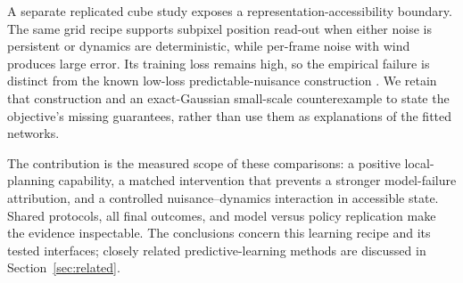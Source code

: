 A separate replicated cube study exposes a representation-accessibility boundary. The same grid
recipe supports subpixel position read-out when either noise is persistent or dynamics are
deterministic, while per-frame noise with wind produces large error. Its training loss remains high,
so the empirical failure is distinct from the known low-loss predictable-nuisance construction
\citep{sobal2022slow}. We retain that construction and an exact-Gaussian small-scale counterexample
to state the objective's missing guarantees, rather than use them as explanations of the fitted
networks.

The contribution is the measured scope of these comparisons: a positive local-planning capability,
a matched intervention that prevents a stronger model-failure attribution, and a controlled
nuisance--dynamics interaction in accessible state. Shared protocols, all final outcomes, and model
versus policy replication make the evidence inspectable. The conclusions concern this learning
recipe and its tested interfaces; closely related predictive-learning methods are discussed in
Section~\ref{sec:related}.
